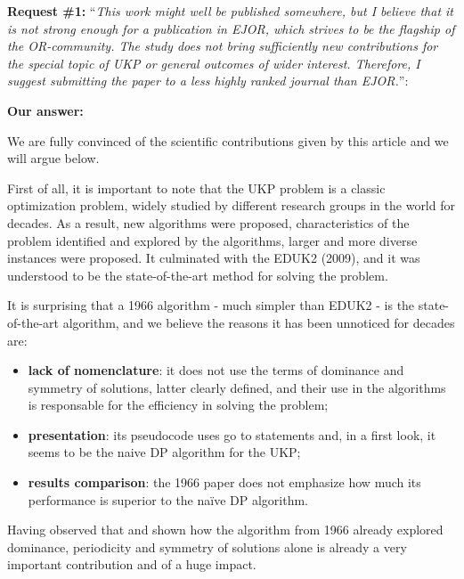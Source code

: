 \documentclass{elsarticle}
\begin{document}
\textbf{Request \#1:} ``\textit{This work might well be published somewhere, but I believe that it is not strong enough for a publication in EJOR, which strives to be the flagship of the OR-community. The study does not bring sufficiently new contributions for the special topic of UKP or general outcomes of wider interest. Therefore, I suggest submitting the paper to a less highly ranked journal than EJOR.}'':

\textbf{Our answer:} 

We are fully convinced of the scientific contributions given by this article and we will argue below.

First of all, it is important to note that the UKP problem is a classic optimization problem,
widely studied by different research groups in the world for decades.
As a result, new algorithms were proposed, characteristics of the problem identified and explored by the algorithms, larger and more diverse instances were proposed.
It culminated with the EDUK2 (2009), and it was understood to be the state-of-the-art method for solving the problem.

It is surprising that a 1966 algorithm - much simpler than EDUK2 - is the state-of-the-art algorithm, and we believe the reasons it has been unnoticed for decades are:

\begin{itemize}

\item \textbf{lack of nomenclature}: it does not use the terms of dominance and symmetry of solutions, latter clearly defined, and their use in the algorithms is responsable for the efficiency in solving the problem;

\item \textbf{presentation}: its pseudocode uses go to statements and, in a first look, it seems to be the naive DP algorithm for the UKP;

\item \textbf{results comparison}: the 1966 paper does not emphasize how much its performance is superior to the naïve DP algorithm.

\end{itemize}

Having observed that and shown how the algorithm from 1966 already explored dominance, periodicity and symmetry of solutions alone is already a very important contribution and of a huge impact.
\end{document}
